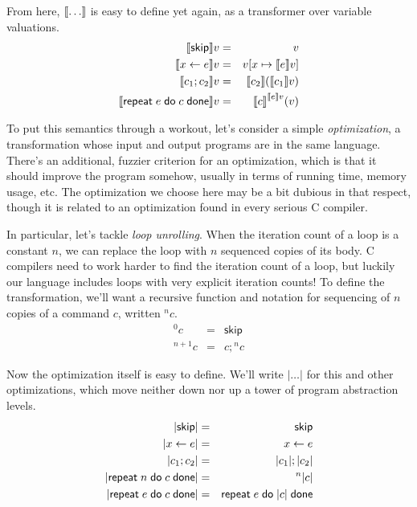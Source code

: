 \documentclass{amsbook}
\theoremstyle{definition}
\theoremstyle{remark}
\numberwithin{section}{chapter}
\numberwithin{equation}{chapter}
\begin{document}
From here, ${\left \llbracket \ldots \right \rrbracket}$ is easy to define yet again, as a transformer over variable valuations.
\encoding
\begin{eqnarray*}
  {\left \llbracket \mathsf{skip} \right \rrbracket}v &=& v \\
  {\left \llbracket x \leftarrow e \right \rrbracket}v &=& v[x \mapsto {\left \llbracket e \right \rrbracket}v] \\
  {\left \llbracket c_1; c_2 \right \rrbracket}v &=& {\left \llbracket c_2 \right \rrbracket}({\left \llbracket c_1 \right \rrbracket}v) \\
  {\left \llbracket \mathsf{repeat} \; e \; \mathsf{do} \; c \; \mathsf{done} \right \rrbracket}v &=& {\left \llbracket c \right \rrbracket}^{{\left \llbracket e \right \rrbracket}v}(v)
\end{eqnarray*}

To put this semantics through a workout, let's consider a simple \emph{optimization}, a transformation whose input and output programs are in the same language.
There's an additional, fuzzier criterion for an optimization, which is that it should improve the program somehow, usually in terms of running time, memory usage, etc.
The optimization we choose here may be a bit dubious in that respect, though it is related to an optimization found in every serious C compiler.

In particular, let's tackle \emph{loop unrolling}.
When the iteration count of a loop is a constant $n$, we can replace the loop with $n$ sequenced copies of its body.
C compilers need to work harder to find the iteration count of a loop, but luckily our language includes loops with very explicit iteration counts!
To define the transformation, we'll want a recursive function and notation for sequencing of $n$ copies of a command $c$, written $^nc$.
\begin{eqnarray*}
  ^0c &=& \mathsf{skip} \\
  ^{n+1}c &=& c; {^nc}
\end{eqnarray*}

\newcommand{\opt}[1]{{\left | #1 \right |}}

Now the optimization itself is easy to define.
We'll write $\opt{\ldots}$ for this and other optimizations, which move neither down nor up a tower of program abstraction levels.
\encoding
\begin{eqnarray*}
  \opt{\mathsf{skip}} &=& \mathsf{skip} \\
  \opt{x \leftarrow e} &=& x \leftarrow e \\
  \opt{c_1; c_2} &=& \opt{c_1}; \opt{c_2} \\
  \opt{\repet{n}{c}} &=& ^n\opt{c} \\
  \opt{\repet{e}{c}} &=& \repet{e}{\opt{c}}
\end{eqnarray*}
\end{document}
